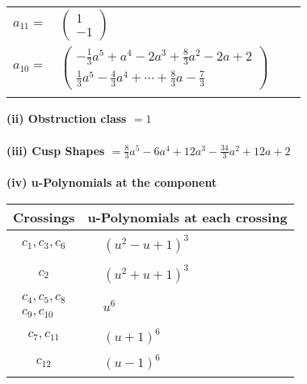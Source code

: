 \documentclass[1p]{elsarticle_modified}
\theoremstyle{definition}
\begin{document}
\begin{tabular}{m{7pt} m{180pt} m{7pt} m{180pt} }
\flushright $a_{11}=$&$\begin{pmatrix}1\\-1\end{pmatrix}$ \\
\flushright $a_{10}=$&$\begin{pmatrix}-\frac{1}{3} a^5+a^4-2 a^3+\frac{8}{3} a^2-2 a+2\\\frac{1}{3} a^5-\frac{4}{3} a^4+\cdots+\frac{8}{3} a-\frac{7}{3}\end{pmatrix}$\\&\end{tabular}
\flushleft \textbf{(ii) Obstruction class $= 1$}\\~\\
\flushleft \textbf{(iii) Cusp Shapes $= \frac{8}{3} a^5-6 a^4+12 a^3-\frac{34}{3} a^2+12 a+2$}\\~\\
\newpage\renewcommand{\arraystretch}{1}
\flushleft \textbf{(iv) u-Polynomials at the component}\newline \\
\begin{tabular}{m{50pt}|m{274pt}}
Crossings & \hspace{64pt}u-Polynomials at each crossing \\
\hline $$\begin{aligned}c_{1},c_{3},c_{6}\end{aligned}$$&$\begin{aligned}
&(u^2- u+1)^3
\end{aligned}$\\
\hline $$\begin{aligned}c_{2}\end{aligned}$$&$\begin{aligned}
&(u^2+u+1)^3
\end{aligned}$\\
\hline $$\begin{aligned}c_{4},c_{5},c_{8}\\c_{9},c_{10}\end{aligned}$$&$\begin{aligned}
&u^6
\end{aligned}$\\
\hline $$\begin{aligned}c_{7},c_{11}\end{aligned}$$&$\begin{aligned}
&(u+1)^6
\end{aligned}$\\
\hline $$\begin{aligned}c_{12}\end{aligned}$$&$\begin{aligned}
&(u-1)^6
\end{aligned}$\\
\hline
\end{tabular}\\~\\
\end{document}
